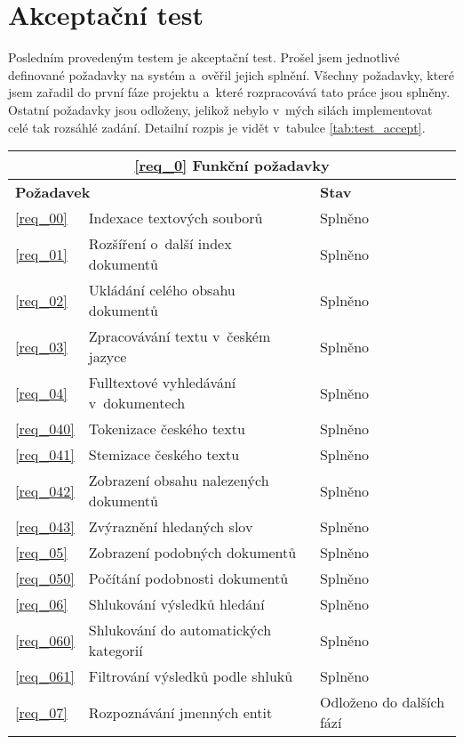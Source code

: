 \section{Akceptační test}
Posledním provedeným testem je akceptační test. Prošel jsem jednotlivé definované požadavky na systém a~ověřil jejich splnění. Všechny požadavky, které jsem zařadil do první fáze projektu a~které rozpracovává tato práce jsou splněny. Ostatní požadavky jsou odloženy, jelikož nebylo v~mých silách implementovat celé tak rozsáhlé zadání. Detailní rozpis je vidět v~tabulce \ref{tab:test_accept}.
\begin{table}
\begin{center}
\begin{tabular}{|l|l|p{6cm}|}
\hline
\multicolumn{3}{|c|}{\textbf{\ref{req_0} Funkční požadavky}} \\ \hline
\multicolumn{2}{|l|}{\textbf{Požadavek}} & \textbf{Stav} \\ \hline
\ref{req_00} & Indexace textových souborů & Splněno\\ \hline 
\ref{req_01} & Rozšíření o~další index dokumentů & Splněno\\ \hline 
\ref{req_02} & Ukládání celého obsahu dokumentů & Splněno\\ \hline 
\ref{req_03} & Zpracovávání textu v~českém jazyce & Splněno\\ \hline 
\ref{req_04} & Fulltextové vyhledávání v~dokumentech & Splněno\\ \hline 
\ref{req_040} & Tokenizace českého textu & Splněno\\ \hline 
\ref{req_041} & Stemizace českého textu & Splněno\\ \hline 
\ref{req_042} & Zobrazení obsahu nalezených dokumentů & Splněno\\ \hline 
\ref{req_043} & Zvýraznění hledaných slov & Splněno\\ \hline 
\ref{req_05} & Zobrazení podobných dokumentů & Splněno\\ \hline 
\ref{req_050} & Počítání podobnosti dokumentů & Splněno\\ \hline 
\ref{req_06} & Shlukování výsledků hledání & Splněno\\ \hline 
\ref{req_060} & Shlukování do automatických kategorií & Splněno\\ \hline 
\ref{req_061} & Filtrování výsledků podle shluků & Splněno\\ \hline 
\ref{req_07} & Rozpoznávání jmenných entit & Odloženo do dalších fází\\ \hline 

\end{tabular}
\end{center}
\end{table}

